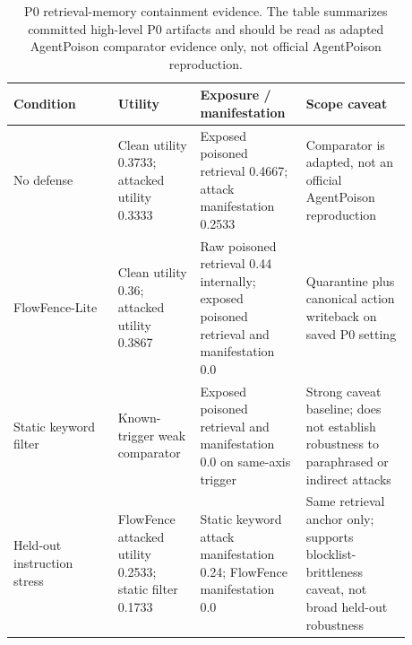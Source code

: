 \begin{table}[t]
\centering
\footnotesize
\begin{tabular}{p{0.24\linewidth}p{0.18\linewidth}p{0.22\linewidth}p{0.24\linewidth}}
\toprule
Condition & Utility & Exposure / manifestation & Scope caveat \\
\midrule
No defense & Clean utility 0.3733; attacked utility 0.3333 & Exposed poisoned retrieval 0.4667; attack manifestation 0.2533 & Comparator is adapted, not an official AgentPoison reproduction \\
FlowFence-Lite & Clean utility 0.36; attacked utility 0.3867 & Raw poisoned retrieval 0.44 internally; exposed poisoned retrieval and manifestation 0.0 & Quarantine plus canonical action writeback on saved P0 setting \\
Static keyword filter & Known-trigger weak comparator & Exposed poisoned retrieval and manifestation 0.0 on same-axis trigger & Strong caveat baseline; does not establish robustness to paraphrased or indirect attacks \\
Held-out instruction stress & FlowFence attacked utility 0.2533; static filter 0.1733 & Static keyword attack manifestation 0.24; FlowFence manifestation 0.0 & Same retrieval anchor only; supports blocklist-brittleness caveat, not broad held-out robustness \\
\bottomrule
\end{tabular}
\caption{P0 retrieval-memory containment evidence. The table summarizes committed high-level P0 artifacts and should be read as adapted AgentPoison comparator evidence only, not official AgentPoison reproduction.}
\label{tab:p0_agentpoison}
\end{table}
